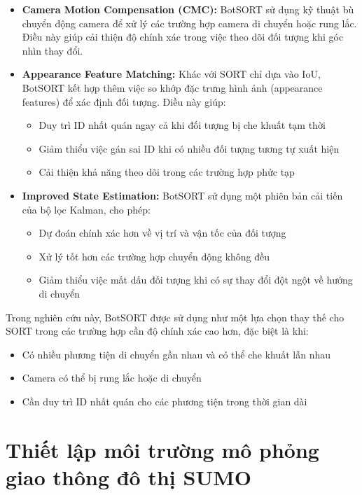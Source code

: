 \begin{itemize}
    \item \textbf{Camera Motion Compensation (CMC):} BotSORT sử dụng kỹ thuật bù chuyển động camera để xử lý các trường hợp camera di chuyển hoặc rung lắc. Điều này giúp cải thiện độ chính xác trong việc theo dõi đối tượng khi góc nhìn thay đổi.

    \item \textbf{Appearance Feature Matching:} Khác với SORT chỉ dựa vào IoU, BotSORT kết hợp thêm việc so khớp đặc trưng hình ảnh (appearance features) để xác định đối tượng. Điều này giúp:
        \begin{itemize}
            \item Duy trì ID nhất quán ngay cả khi đối tượng bị che khuất tạm thời
            \item Giảm thiểu việc gán sai ID khi có nhiều đối tượng tương tự xuất hiện
            \item Cải thiện khả năng theo dõi trong các trường hợp phức tạp
        \end{itemize}

    \item \textbf{Improved State Estimation:} BotSORT sử dụng một phiên bản cải tiến của bộ lọc Kalman, cho phép:
        \begin{itemize}
            \item Dự đoán chính xác hơn về vị trí và vận tốc của đối tượng
            \item Xử lý tốt hơn các trường hợp chuyển động không đều
            \item Giảm thiểu việc mất dấu đối tượng khi có sự thay đổi đột ngột về hướng di chuyển
        \end{itemize}
\end{itemize}

Trong nghiên cứu này, BotSORT được sử dụng như một lựa chọn thay thế cho SORT trong các trường hợp cần độ chính xác cao hơn, đặc biệt là khi:
\begin{itemize}
    \item Có nhiều phương tiện di chuyển gần nhau và có thể che khuất lẫn nhau

    \item Camera có thể bị rung lắc hoặc di chuyển

    \item Cần duy trì ID nhất quán cho các phương tiện trong thời gian dài
\end{itemize}

\section{Thiết lập môi trường mô phỏng giao thông đô thị SUMO}
